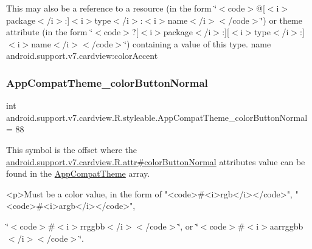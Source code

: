 This may also be a reference to a resource (in the form \char`\"{}$<$code$>$@\mbox{[}$<$i$>$package$<$/i$>$\+:\mbox{]}$<$i$>$type$<$/i$>$\+:$<$i$>$name$<$/i$>$$<$/code$>$\char`\"{}) or theme attribute (in the form \char`\"{}$<$code$>$?\mbox{[}$<$i$>$package$<$/i$>$\+:\mbox{]}\mbox{[}$<$i$>$type$<$/i$>$\+:\mbox{]}$<$i$>$name$<$/i$>$$<$/code$>$\char`\"{}) containing a value of this type.  name android.\+support.\+v7.\+cardview\+:color\+Accent \mbox{\label{classandroid_1_1support_1_1v7_1_1cardview_1_1R_1_1styleable_ac1be9238d1481c26c4f89271a750fce2}} 
\subsubsection{\texorpdfstring{App\+Compat\+Theme\+\_\+color\+Button\+Normal}{AppCompatTheme\_colorButtonNormal}}
{\footnotesize\ttfamily int android.\+support.\+v7.\+cardview.\+R.\+styleable.\+App\+Compat\+Theme\+\_\+color\+Button\+Normal = 88\hspace{0.3cm}{\ttfamily [static]}}

This symbol is the offset where the \hyperlink{classandroid_1_1support_1_1v7_1_1cardview_1_1R_1_1attr_a790b4cbf7f9e74effc8b0f61310c0572}{android.\+support.\+v7.\+cardview.\+R.\+attr\#color\+Button\+Normal} attribute\textquotesingle{}s value can be found in the \hyperlink{classandroid_1_1support_1_1v7_1_1cardview_1_1R_1_1styleable_a52e6f69f954ecc2622d72c0b4d298938}{App\+Compat\+Theme} array.

\begin{DoxyVerb}      <p>Must be a color value, in the form of "<code>#<i>rgb</i></code>", "<code>#<i>argb</i></code>",
\end{DoxyVerb}
 \char`\"{}$<$code$>$\#$<$i$>$rrggbb$<$/i$>$$<$/code$>$\char`\"{}, or \char`\"{}$<$code$>$\#$<$i$>$aarrggbb$<$/i$>$$<$/code$>$\char`\"{}. 

